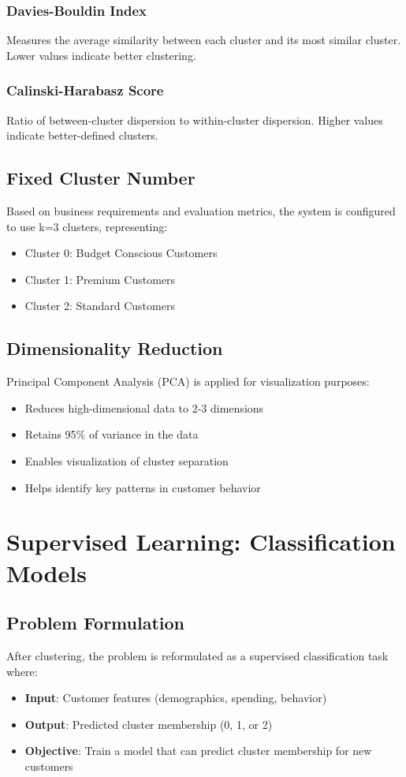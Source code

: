 \documentclass[12pt,a4paper]{report}
\begin{document}
\subsubsection{Davies-Bouldin Index}
Measures the average similarity between each cluster and its most similar cluster. Lower values indicate better clustering.

\subsubsection{Calinski-Harabasz Score}
Ratio of between-cluster dispersion to within-cluster dispersion. Higher values indicate better-defined clusters.

\subsection{Fixed Cluster Number}
\noindent Based on business requirements and evaluation metrics, the system is configured to use k=3 clusters, representing:
\begin{itemize}
    \item Cluster 0: Budget Conscious Customers
    \item Cluster 1: Premium Customers
    \item Cluster 2: Standard Customers
\end{itemize}

\subsection{Dimensionality Reduction}
\noindent Principal Component Analysis (PCA) is applied for visualization purposes:
\begin{itemize}
    \item Reduces high-dimensional data to 2-3 dimensions
    \item Retains 95\% of variance in the data
    \item Enables visualization of cluster separation
    \item Helps identify key patterns in customer behavior
\end{itemize}


\section{Supervised Learning: Classification Models}

\subsection{Problem Formulation}
\noindent After clustering, the problem is reformulated as a supervised classification task where:
\begin{itemize}
    \item \textbf{Input}: Customer features (demographics, spending, behavior)
    \item \textbf{Output}: Predicted cluster membership (0, 1, or 2)
    \item \textbf{Objective}: Train a model that can predict cluster membership for new customers
\end{itemize}
\end{document}
